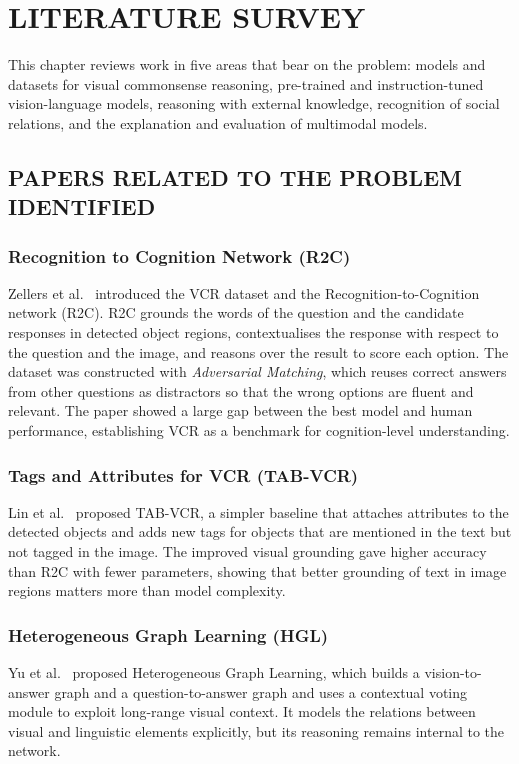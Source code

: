 
\chapter{LITERATURE SURVEY} %
\label{ch:lit}

This chapter reviews work in five areas that bear on the problem: models and datasets for visual commonsense reasoning, pre-trained and instruction-tuned vision-language models, reasoning with external knowledge, recognition of social relations, and the explanation and evaluation of multimodal models.

\section{PAPERS RELATED TO THE PROBLEM IDENTIFIED}

\subsection{Recognition to Cognition Network (R2C)}
Zellers et al.~\cite{zellers2019vcr} introduced the VCR dataset and the Recognition-to-Cognition network (R2C). R2C grounds the words of the question and the candidate responses in detected object regions, contextualises the response with respect to the question and the image, and reasons over the result to score each option. The dataset was constructed with \emph{Adversarial Matching}, which reuses correct answers from other questions as distractors so that the wrong options are fluent and relevant. The paper showed a large gap between the best model and human performance, establishing VCR as a benchmark for cognition-level understanding.

\subsection{Tags and Attributes for VCR (TAB-VCR)}
Lin et al.~\cite{lin2019tabvcr} proposed TAB-VCR, a simpler baseline that attaches attributes to the detected objects and adds new tags for objects that are mentioned in the text but not tagged in the image. The improved visual grounding gave higher accuracy than R2C with fewer parameters, showing that better grounding of text in image regions matters more than model complexity.

\subsection{Heterogeneous Graph Learning (HGL)}
Yu et al.~\cite{yu2019hgl} proposed Heterogeneous Graph Learning, which builds a vision-to-answer graph and a question-to-answer graph and uses a contextual voting module to exploit long-range visual context. It models the relations between visual and linguistic elements explicitly, but its reasoning remains internal to the network.

